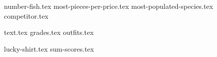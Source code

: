 \documentclass{exam}
\begin{document}
\begin{questions}
  {number-fish.tex}
  {most-pieces-per-price.tex}
  {most-populated-species.tex}
  {competitor.tex}
\end{questions}
\newpage

{text.tex}
{grades.tex}
{outfits.tex}

\begin{questions}
  {lucky-shirt.tex}
  {sum-scores.tex}
\end{questions}
\end{document}
